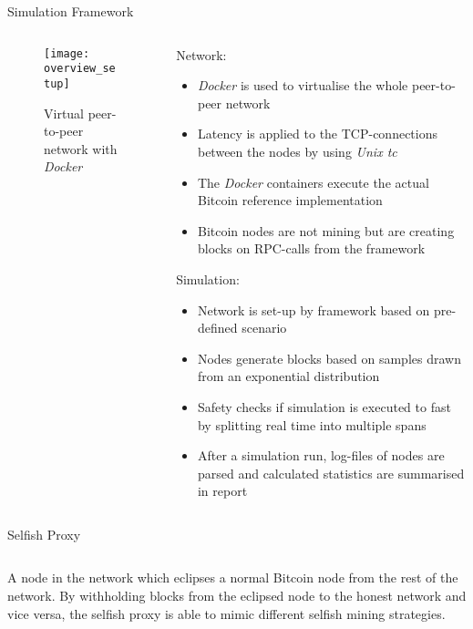 \documentclass[final,hyperref={pdfpagelabels=true}]{beamer}
\begin{document}
\begin{frame}
\begin{columns}[t]
  \end{columns}

  \begin{block}{Simulation Framework}
  \begin{columns}[t]

    \begin{column}{.3\textwidth}
		
		\begin{figure}[t]
		    \vspace*{-1cm}
			\texttt{[image: overview\_setup]}
			\centering
			\caption{Virtual peer-to-peer network with \textit{Docker}}
		\end{figure}      	
      
    \end{column}

    \begin{column}{.6\textwidth}
    	Network:
     	\begin{itemize}
     		\item \textit{Docker} is used to virtualise the whole peer-to-peer network
     		\item Latency is applied to the TCP-connections between the nodes by using \textit{Unix tc}
     		\item The \textit{Docker} containers execute the actual Bitcoin reference implementation
     		\item Bitcoin nodes are not mining but are creating blocks on RPC-calls from the framework
     	\end{itemize}
     	Simulation:
       	\begin{itemize}
     		\item Network is set-up by framework based on pre-defined scenario
     		\item Nodes generate blocks based on samples drawn from an exponential distribution
     		\item Safety checks if simulation is executed to fast by splitting real time into multiple spans
     		\item After a simulation run, log-files of nodes are parsed and calculated statistics are summarised in report 	\end{itemize}
    \end{column}

  \end{columns}
  \end{block}
  
  \begin{block}{Selfish Proxy}
  	\begin{columns}[t]
     	\begin{column}{.45\textwidth}
     		A node in the network which eclipses a normal Bitcoin node from the rest of the network. By withholding blocks from the eclipsed node to the honest network and vice versa, the selfish proxy is able to mimic different selfish mining strategies.
     		

\end{column}
\end{columns}
\end{block}
\end{frame}
\end{document}
